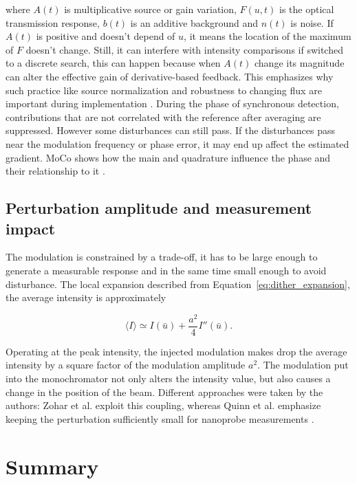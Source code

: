 where $A(t)$ is multiplicative source or gain variation, $F(u,t)$ is the optical transmission response, $b(t)$ is an additive background and $n(t)$ is noise.
If $A(t)$ is positive and doesn't depend of $u$, it means the location of the maximum of $F$ doesn't change.
Still, it can interfere with intensity comparisons if switched to a discrete search, this can happen because when $A(t)$ change its magnitude can alter the effective gain of derivative-based feedback.
This emphasizes why such practice like source normalization and robustness to changing flux are important during implementation \cite{MoCo2008,vanSilfhout2014}.
During the phase of synchronous detection, contributions that are not correlated with the reference after averaging are suppressed. 
However some disturbances can still pass.
If the disturbances pass near the modulation frequency or phase error, it may end up affect the estimated gradient.
MoCo shows how the main and quadrature influence the phase and their relationship to it \cite{MoCo2008}.

\subsection{Perturbation amplitude and measurement impact}

The modulation is constrained by a trade-off, it has to be large enough to generate a measurable response and in the same time small enough to avoid disturbance.
The local expansion described from Equation~\eqref{eq:dither_expansion}, the average intensity is approximately

\begin{equation}
    \langle I\rangle
    \simeq
    I(\bar{u})
    +
    \frac{a^2}{4}I''(\bar{u}).
    \label{eq:mean_modulated_intensity}
\end{equation}

Operating at the peak intensity, the injected modulation makes drop the average intensity by a square factor of the modulation amplitude $a^2$.
The modulation put into the monochromator not only alters the intensity value, but also causes a change in the position of the beam.
Different approaches were taken by the authors: Zohar et al. exploit this coupling, whereas Quinn et al. emphasize keeping the perturbation sufficiently small for nanoprobe measurements \cite{Zohar2016,Quinn2021}.

\section{Summary}

